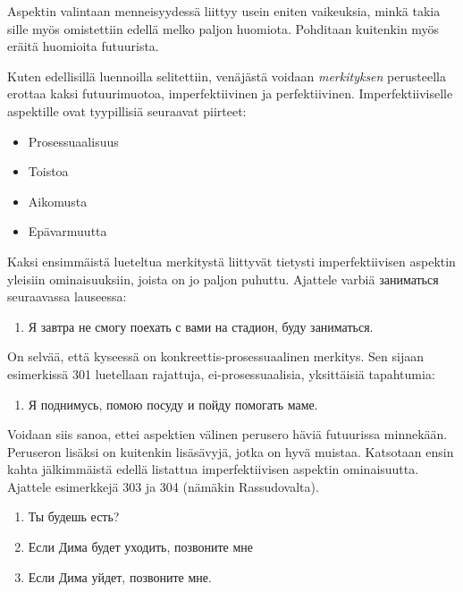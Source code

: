 \documentclass[]{scrartcl}
\providecommand{\tightlist}{%
  \setlength{\itemsep}{0pt}\setlength{\parskip}{0pt}}
\begin{document}
Aspektin valintaan menneisyydessä liittyy usein eniten vaikeuksia, minkä
takia sille myös omistettiin edellä melko paljon huomiota. Pohditaan
kuitenkin myös eräitä huomioita futuurista.

Kuten edellisillä luennoilla selitettiin, venäjästä voidaan
\emph{merkityksen} perusteella erottaa kaksi futuurimuotoa,
imperfektiivinen ja perfektiivinen. Imperfektiiviselle aspektille ovat
tyypillisiä seuraavat piirteet:

\begin{itemize}
\tightlist
\item
  Prosessuaalisuus
\item
  Toistoa
\item
  Aikomusta
\item
  Epävarmuutta
\end{itemize}

Kaksi ensimmäistä lueteltua merkitystä liittyvät tietysti
imperfektiivisen aspektin yleisiin ominaisuuksiin, joista on jo paljon
puhuttu. Ajattele varbiä заниматься seuraavassa lauseessa:

\begin{enumerate}
\def\labelenumi{(\arabic{enumi})}
\setcounter{enumi}{299}
\tightlist
\item
  Я завтра не смогу поехать с вами на стадион, буду заниматься.
\end{enumerate}

On selvää, että kyseessä on konkreettis-prosessuaalinen merkitys. Sen
sijaan esimerkissä 301 luetellaan rajattuja, ei-prosessuaalisia,
yksittäisiä tapahtumia:

\begin{enumerate}
\def\labelenumi{(\arabic{enumi})}
\setcounter{enumi}{300}
\tightlist
\item
  Я поднимусь, помою посуду и пойду помогать маме.
\end{enumerate}

Voidaan siis sanoa, ettei aspektien välinen perusero häviä futuurissa
minnekään. Peruseron lisäksi on kuitenkin lisäsävyjä, jotka on hyvä
muistaa. Katsotaan ensin kahta jälkimmäistä edellä listattua
imperfektiivisen aspektin ominaisuutta. Ajattele esimerkkejä 303 ja 304
(nämäkin Rassudovalta).

\begin{enumerate}
\def\labelenumi{(\arabic{enumi})}
\setcounter{enumi}{301}
\tightlist
\item
  Ты будешь есть?
\item
  Если Дима будет уходить, позвоните мне
\item
  Если Дима уйдет, позвоните мне.
\end{enumerate}
\end{document}
